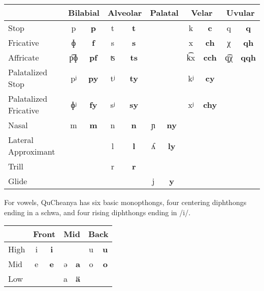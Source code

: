 \documentclass{article}
\begin{document}
\begin{table}[h]
\begin{tabular}{l| c c | c c | c c | c c | c c}
& \multicolumn{2}{c}{Bilabial} & \multicolumn{2}{c}{Alveolar} & \multicolumn{2}{c}{Palatal} & \multicolumn{2}{c}{Velar} & \multicolumn{2}{c}{Uvular} \\
\hline
Stop & p & \textbf{p} & t & \textbf{t} & & & k & \textbf{c} & q & \textbf{q} \\
Fricative & ɸ & \textbf{f} & s & \textbf{s} & & & x & \textbf{ch} & χ & \textbf{qh} \\
Affricate & p͡ɸ & \textbf{pf} & ʦ & \textbf{ts} & & & k͡x & \textbf{cch} & q͡χ & \textbf{qqh} \\
Palatalized Stop & pʲ & \textbf{py} & tʲ & \textbf{ty} & & & kʲ & \textbf{cy} & & \\
Palatalized Fricative & ɸʲ & \textbf{fy} & sʲ & \textbf{sy} & & & xʲ & \textbf{chy} & & \\
Nasal & m & \textbf{m} & n & \textbf{n} & ɲ & \textbf{ny} & & & & \\
Lateral Approximant & & & l & \textbf{l} & ʎ & \textbf{ly} & & & & \\
Trill & & & r & \textbf{r} & & & & & & \\
Glide & & & & & j & \textbf{y} & & & & \\
\hline
\end{tabular}
\end{table}

For vowels, QuCheanya has six basic monopthongs, four centering diphthongs ending in a schwa, and four rising diphthongs ending in /i/.

\begin{table}[h]
\begin{tabular}{l| c c | c c | c c}
& \multicolumn{2}{c}{Front} & \multicolumn{2}{c}{Mid} & \multicolumn{2}{c}{Back} \\
\hline
High & i & \textbf{i} & & & u & \textbf{u} \\
Mid & e & \textbf{e} & ə & \textbf{a} & o & \textbf{o} \\
Low & & & a & \textbf{\"a} & & \\
\end{tabular}
\end{table}
\end{document}
